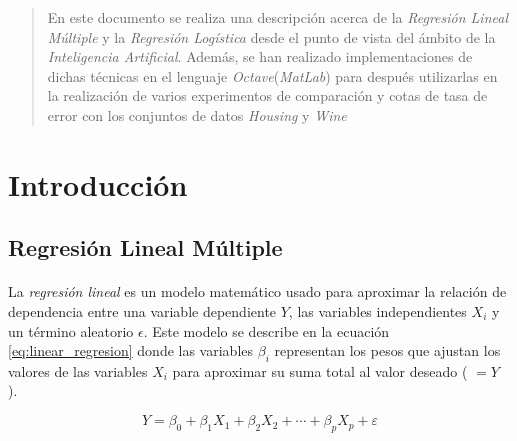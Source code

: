 \documentclass{article}
\begin{document}
	\maketitle %

	\thispagestyle{fancy} %



	\begin{abstract}
		\noindent En este documento se realiza una descripción acerca de la \emph{Regresión Lineal Múltiple} y la \emph{Regresión Logística} desde el punto de vista del ámbito de la \emph{Inteligencia Artificial}. Además, se han realizado implementaciones de dichas técnicas en el lenguaje \emph{Octave}(\emph{MatLab}) para después utilizarlas en la realización de varios experimentos de comparación y cotas de tasa de error con los conjuntos de datos \emph{Housing} \cite{dataset:housing} y \emph{Wine}\cite{dataset:wine}
	\end{abstract}



	\section{Introducción}
	\label{sec:introducción}

		\subsection{Regresión Lineal Múltiple}

			\paragraph{}
			La \emph{regresión lineal} es un modelo matemático usado para aproximar la relación de dependencia entre una variable dependiente $Y$, las variables independientes $X_i$ y un término aleatorio $\epsilon$. Este modelo se describe en la ecuación \eqref{eq:linear_regresion} donde las variables $\beta_i$ representan los pesos que ajustan los valores de las variables $X_i$ para aproximar su suma total al valor deseado ( $= Y$ ).

			\begin{equation}
			\label{eq:linear_regresion}
				{\displaystyle Y=\beta _{0}+\beta _{1}X_{1}+\beta _{2}X_{2}+\cdots +\beta _{p}X_{p}+\varepsilon }
			\end{equation}
\end{document}
